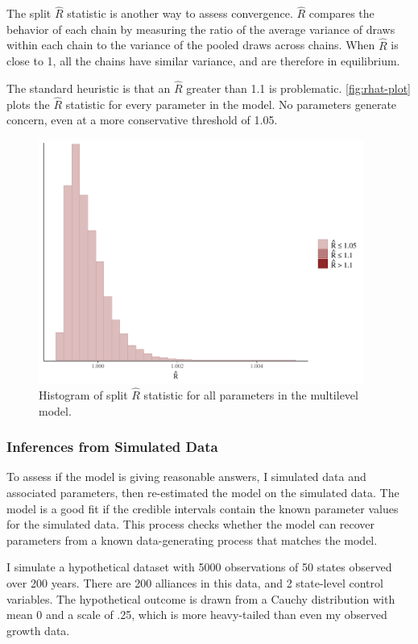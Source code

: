 \documentclass[12pt]{article}
\begin{document}
The split $\hat{R}$ statistic is another way to assess convergence. 
$\hat{R}$ compares the behavior of each chain by measuring the ratio of the average variance of draws within each chain to the variance of the pooled draws across chains. 
When $\hat{R}$ is close to 1, all the chains have similar variance, and are therefore in equilibrium. 


The standard heuristic is that an $\hat{R}$ greater than 1.1 is problematic. 
\autoref{fig:rhat-plot} plots the $\hat{R}$ statistic for every parameter in the model. 
No parameters generate concern, even at a more conservative threshold of 1.05. 


\begin{figure}[htbp]
	\centering
		\includegraphics[width=0.95\textwidth]{rhat-plot.pdf}
	\caption{Histogram of split $\hat{R}$ statistic for all parameters in the multilevel model.}
	\label{fig:rhat-plot}
\end{figure}


\subsubsection{Inferences from Simulated Data}


To assess if the model is giving reasonable answers, I simulated data and associated parameters, then re-estimated the model on the simulated data.
The model is a good fit if the credible intervals contain the known parameter values for the simulated data. 
This process checks whether the model can recover parameters from a known data-generating process that matches the model. 


I simulate a hypothetical dataset with 5000 observations of 50 states observed over 200 years. 
There are 200 alliances in this data, and 2 state-level control variables. 
The hypothetical outcome is drawn from a Cauchy distribution with mean 0 and a scale of .25, which is more heavy-tailed than even my observed growth data. 
\end{document}

